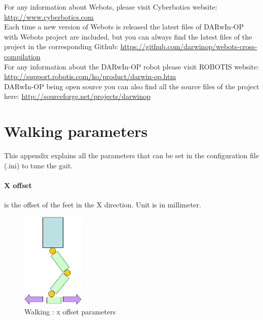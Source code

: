 \documentclass[a4paper, 12pt]{article}  		%
\begin{document}
For any information about Webots, please visit Cyberbotics website: \url{http://www.cyberbotics.com}\\

Each time a new version of Webots is released the latest files of DARwIn-OP with Webots project are included, but you can always find the latest files of the project in the corresponding Github: \url{https://github.com/darwinop/webots-cross-compilation}\\

For any information about the DARwIn-OP robot please visit ROBOTIS website: \url{http://support.robotis.com/ko/product/darwin-op.htm}\\

DARwIn-OP being open source you can also find all the source files of the project here: \url{http://sourceforge.net/projects/darwinop}\\


\appendix
\newpage
{} %


\section{Walking parameters} \label{sec:walkParameter}

This appendix explains all the parameters that can be set in the configuration file (.ini) to tune the gait.\\ 

\paragraph*{X offset}
is the offset of the feet in the X direction. Unit is in millimeter.
\begin{figure}[H]
\begin{center}
\includegraphics[width=3cm]{x_offset.jpg}
\caption{Walking : x offset parameters}
\label{x_offset}
\end{center}
\end{figure}
\end{document}
